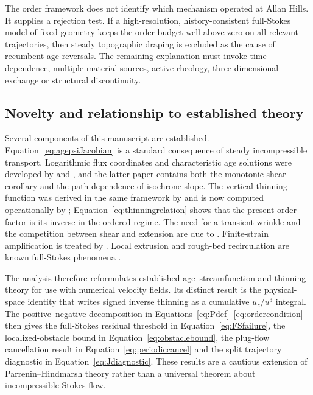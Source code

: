 \documentclass[review]{igs}
\newcommand{\parencite}{\citep}
\newcommand{\textcite}{\citet}
\theoremstyle{definition}
\theoremstyle{remark}
\begin{document}
The order framework does not identify which mechanism operated at Allan Hills. It supplies a rejection test. If a high-resolution, history-consistent full-Stokes model of fixed geometry keeps the order budget well above zero on all relevant trajectories, then steady topographic draping is excluded as the cause of recumbent age reversals. The remaining explanation must invoke time dependence, multiple material sources, active rheology, three-dimensional exchange or structural discontinuity.

\subsection{Novelty and relationship to established theory}

Several components of this manuscript are established. Equation~\eqref{eq:agepsiJacobian} is a standard consequence of steady incompressible transport. Logarithmic flux coordinates and characteristic age solutions were developed by \textcite{ParreninHindmarshRemy2006} and \textcite{ParreninHindmarsh2007}, and the latter paper contains both the monotonic-shear corollary and the path dependence of isochrone slope. The vertical thinning function was derived in the same framework by \textcite{Parrenin2013} and is now computed operationally by \textcite{ParreninChungMartin2025}; Equation~\eqref{eq:thinningrelation} shows that the present order factor is its inverse in the ordered regime. The need for a transient wrinkle and the competition between shear and extension are due to \textcite{Waddington2001}. Finite-strain amplification is treated by \textcite{JacobsonWaddington2004}. Local extrusion and rough-bed recirculation are known full-Stokes phenomena \parencite{Gudmundsson1997linear,Gudmundsson1997nonlinear}.

The analysis therefore reformulates established age--streamfunction and thinning theory for use with numerical velocity fields. Its distinct result is the physical-space identity that writes signed inverse thinning as a cumulative \(u_z/u^3\) integral. The positive--negative decomposition in Equations~\eqref{eq:Pdef}--\eqref{eq:ordercondition} then gives the full-Stokes residual threshold in Equation~\eqref{eq:FSfailure}, the localized-obstacle bound in Equation~\eqref{eq:obstaclebound}, the plug-flow cancellation result in Equation~\eqref{eq:periodiccancel} and the split trajectory diagnostic in Equation~\eqref{eq:Jdiagnostic}. These results are a cautious extension of Parrenin--Hindmarsh theory rather than a universal theorem about incompressible Stokes flow.
\end{document}
